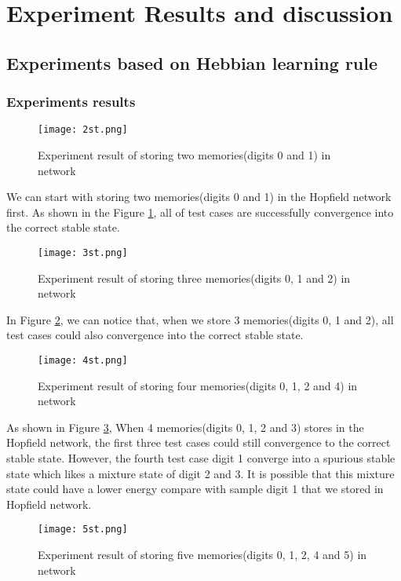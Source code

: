 \section{Experiment Results and discussion}
\subsection{Experiments based on Hebbian learning rule}
\subsubsection{Experiments results}

\begin{figure}[h]
\centering
\texttt{[image: 2st.png]}
\caption{Experiment result of storing two memories(digits 0 and 1) in network}
\label{fg:ex1}
\end{figure}

We can start with storing two memories(digits 0 and 1) in the Hopfield network first. As shown in the Figure \ref{fg:ex1}, all of test cases are successfully convergence into the correct stable state. \\

\begin{figure}[h]
\centering
\texttt{[image: 3st.png]}
\caption{Experiment result of storing three memories(digits 0, 1 and 2) in network}
\label{fg:ex2}
\end{figure}

In Figure \ref{fg:ex2}, we can notice that, when we store 3 memories(digits 0, 1 and 2), all test cases could also convergence into the correct stable state. \\

\begin{figure}[h]
\centering
\texttt{[image: 4st.png]}
\caption{Experiment result of storing four memories(digits 0, 1, 2 and 4) in network}
\label{fg:ex3}
\end{figure}

As shown in Figure \ref{fg:ex3}, When 4 memories(digits 0, 1, 2 and 3) stores in the Hopfield network, the first three test cases could still convergence to the correct stable state. However, the fourth test case digit 1 converge into a spurious stable state which likes a mixture state of digit 2 and 3. It is possible that this mixture state could have a lower energy compare with sample digit 1 that we stored in Hopfield network. \\

\begin{figure}[h]
\centering
\texttt{[image: 5st.png]}
\caption{Experiment result of storing five memories(digits 0, 1, 2, 4 and 5) in network}
\label{fg:ex4}
\end{figure}

